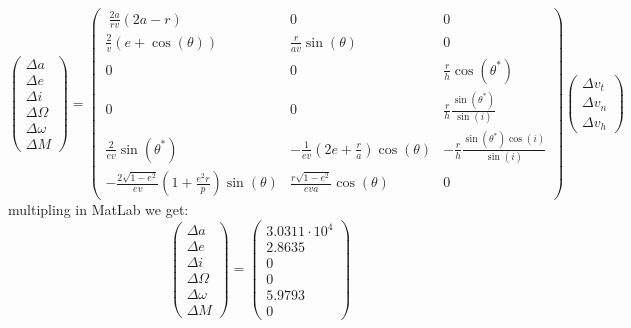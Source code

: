 \documentclass[11pt, a4paper]{article}
\begin{document}
\begin{equation}
    \begin{pmatrix}
        \Delta a\\
        \Delta e\\
        \Delta i\\
        \Delta \Omega\\
        \Delta \omega\\
        \Delta M
    \end{pmatrix}
    = \begin{pmatrix}\
        \frac{2a}{rv}\left(2a-r\right) & 0 & 0 \\
        \frac{2}{v}\left(e+\cos\left(\theta\right)\right) & \frac{r}{av}\sin\left(\theta\right) & 0 \\
        0 & 0 & \frac{r}{h}\cos\left(\theta^*\right) \\
        0 & 0 & \frac{r}{h}\frac{\sin\left(\theta^*\right)}{\sin\left(i\right)} \\
        \frac{2}{ev}\sin\left(\theta^*\right) & -\frac{1}{ev}\left(2e+\frac{r}{a}\right)\cos\left(\theta\right) &  -\frac{r}{h}\frac{\sin\left(\theta^*\right)\cos\left(i\right)}{\sin\left(i\right)} \\
        -\frac{2\sqrt{1-e^2}}{ev}\left(1+\frac{e^2r}{p}\right)\sin\left(\theta\right) & \frac{r\sqrt{1-e^2}}{eva}\cos\left(\theta\right) & 0

    \end{pmatrix}
    \begin{pmatrix}
        \Delta v_t \\
        \Delta v_n \\
        \Delta v_h
    \end{pmatrix}
\end{equation}
multipling in MatLab we get:
\begin{equation}
    \begin{pmatrix}
        \Delta a\\
        \Delta e\\
        \Delta i\\
        \Delta \Omega\\
        \Delta \omega\\
        \Delta M
    \end{pmatrix}
    =
    \begin{pmatrix}
        3.0311\cdot10^4 \\
        2.8635 \\ 
        0 \\ 
        0 \\
        5.9793 \\ 
        0
    \end{pmatrix}
\end{equation}
\end{document}
